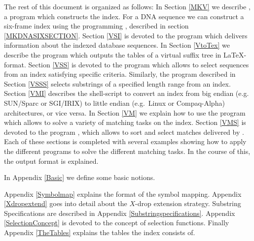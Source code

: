 \documentclass[12pt,titlepage]{article}
\newcommand{\Ignoreregexp}[1]{}
\newcommand{\Ignoreregexp}[1]{#1}
\begin{document}
\begin{AboutVmatch}
The rest of this
document is organized as follows: In Section \ref{MKV} we describe
\MKV, a program which constructs the index. For a DNA sequence
we can construct a six-frame index using the programming 
\MKDNASIX, described in section \ref{MKDNASIXSECTION}.
Section \ref{VSI} is devoted to
the program \VSI which delivers information about the indexed
database sequences.
In Section 
\ref{VtoTex} we describe the program \VtoTex which outputs the tables
of a virtual suffix tree in \LaTeX-format.
Section \ref{VSS} is devoted to the program
\VSS which allows to select sequences from an index satisfying specific
criteria. Similarly, the program \VSSS described in Section \ref{VSSS}
selects substrings of a specified length range from an
index. Section \ref{VMI} describes the shell-script \VMI to convert
an index from big endian (e.g.\  SUN/Sparc or  
SGI/IRIX) to 
little endian (e.g.\ Linux  or  Compaq-Alpha)
architectures, or vice versa.
In Section \ref{VM} we explain
how to use the program \VM which allows to solve a variety of matching 
tasks on the index. Section \ref{VMS} is devoted to the program \VMS,
which allows to sort and select matches delivered by \VM.
Each of these sections is completed with several examples showing how
to apply the different programs to solve the different matching tasks.
In the course of this, the output format is explained.

In Appendix \ref{Basic} we define some basic notions. 
\Ignoreregexp{
Appendix \ref{Regexpdef} gives a precise definition of the
notion of regular expressions, as used in \VM.}
Appendix \ref{Symbolmap} explains the format of 
the symbol mapping.
Appendix \ref{Xdropextend} goes into detail about the 
\(X\)-drop extension strategy.
Substring Specifications are described in Appendix 
\ref{Substringspecifications}.
Appendix \ref{SelectionConcept} is devoted to the concept of
selection functions.
Finally Appendix \ref{TheTables} explains the tables 
the index consists of.
\end{AboutVmatch}
\end{document}
